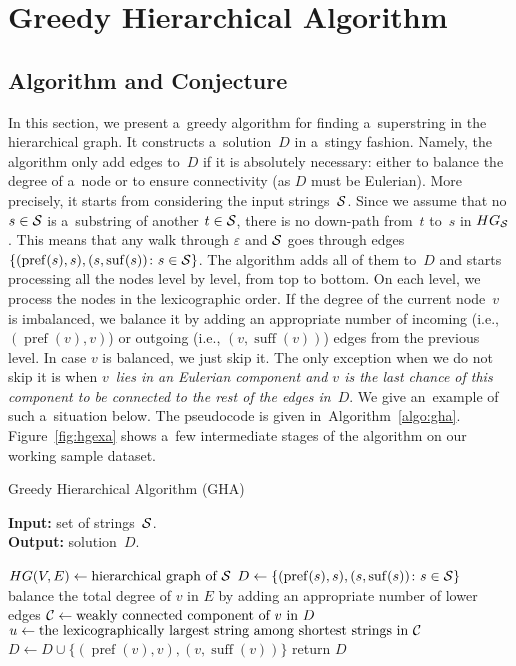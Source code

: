 \documentclass[11pt]{article}
\DeclareMathOperator{\pref}{pref}
\DeclareMathOperator{\suff}{suff}
\begin{document}
\section{Greedy Hierarchical Algorithm}
\subsection{Algorithm and Conjecture}
In this section, we present a~greedy algorithm for
finding a~superstring in the hierarchical graph. 
It constructs a~solution~$D$ in a~stingy fashion. 
Namely, the algorithm only add edges to~$D$ 
if it is absolutely necessary: either to balance the degree of a~node or to ensure connectivity 
(as $D$ must be Eulerian). 
More precisely, it starts from considering the input
strings~${\cal S}$. Since we assume that 
no $s \in {\cal S}$ is a~substring of another 
$t \in {\cal S}$, there is no down-path from~$t$ to~$s$ in $HG_{\cal S}$. 
This means that any walk through $\varepsilon$ and ${\cal S}$ goes through edges $\{(\operatorname{pref}(s), s), (s, \operatorname{suf}(s)) \colon s \in {\cal S}\}$. The algorithm adds all of them to~$D$ and starts processing all the nodes level by level, from top to bottom. On each level, we process the nodes in the lexicographic order. If the degree of the current node~$v$ is imbalanced, we balance it by adding an appropriate number of incoming (i.e., $(\pref(v),v)$) or outgoing (i.e., $(v, \suff(v))$) edges from the previous level. In case $v$ is balanced, we just skip it. The only exception when we do not skip it is when {\em $v$~lies in an Eulerian component and $v$ is the last chance of this component to be connected to the rest of the edges in~$D$}. We give an~example of such a~situation below. The pseudocode is given in~Algorithm~\ref{algo:gha}. Figure~\ref{fig:hgexa} shows a~few intermediate stages of the algorithm on our working sample dataset.


\begin{algorithm}[ht]
\label{algo:gha}
\caption{Greedy Hierarchical Algorithm (GHA)}
\hspace*{\algorithmicindent} \textbf{Input:} set of strings~${\cal S}$.\\
\hspace*{\algorithmicindent} \textbf{Output:} solution~$D$.
\begin{algorithmic}[1]
\State $HG(V,E) \gets \text{hierarchical graph of ${\cal S}$}$ 
\State $D \gets \{(\operatorname{pref}(s), s), (s, \operatorname{suf}(s)) \colon s \in {\cal S}\}$
\State balance the total degree of $v$ in $E$ by adding an appropriate number of lower edges
\Else
\State ${\cal C} \gets \text{weakly connected component of $v$ in $D$}$
\State $u \gets \text{the lexicographically largest string among shortest strings in ${\cal C}$}$
\State $D \gets D \cup \{(\pref(v), v), (v, \suff(v))\}$
\EndIf
\EndIf
\EndFor
\EndFor
\State return $D$
\end{algorithmic}
\end{algorithm}
\end{document}
